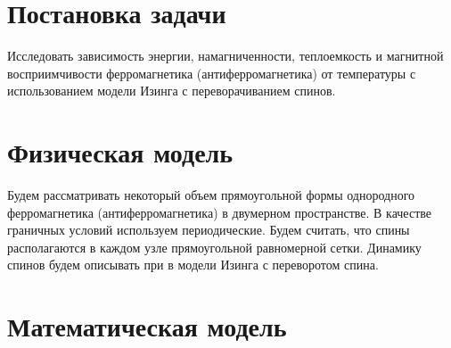 \documentclass[12pt,a4paper]{article}
\begin{document}
    

    \tableofcontents

    \clearpage


    \section{Постановка задачи}

        Исследовать зависимость энергии, намагниченности, теплоемкость и магнитной восприимчивости ферромагнетика (антиферромагнетика) от температуры с использованием модели Изинга с переворачиванием спинов.


    \section{Физическая модель}

        Будем рассматривать некоторый объем прямоугольной формы однородного ферромагнетика (антиферромагнетика) в двумерном пространстве. В качестве граничных условий используем периодические. Будем считать, что спины располагаются в каждом узле прямоугольной равномерной сетки. Динамику спинов будем описывать при в модели Изинга с переворотом спина.


    \section{Математическая модель}

\end{document}
